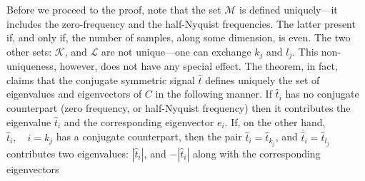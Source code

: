 Before we proceed to the proof, note that the set $\mathcal{M}$ is
defined uniquely---it includes the zero-frequency and the
half-Nyquist
frequencies. The latter present if, and only if, the number
of samples, along some dimension, is even. The two other sets:
$\mathcal{K}$, and $\mathcal{L}$ are not unique---one can exchange
$k_{j}$ and $l_{j}$. This non-uniqueness, however, does not have any
special effect. The theorem, in fact, claims that the conjugate
symmetric signal $\hat{t}$ defines uniquely the set of eigenvalues
and eigenvectors of $C$ in the following manner. If $\hat{t}_{i}$
has no conjugate counterpart (zero frequency, or half-Nyquist
frequency) then it contributes the eigenvalue $\hat{t}_{i}$ and the
corresponding eigenvector $e_{i}$. If, on the other hand,
$\hat{t}_{i}, \quad i = k_{j}$ has a conjugate counterpart, then
the pair  $\hat{t}_{i}=\hat{t}_{k_{j}}$, and $\bar{\hat{t}}_{i} =
\hat{t}_{l_{j}}$ contributes two eigenvalues:
$|\hat{t}_{i}|$, and $-|\hat{t}_{i}|$ along with the corresponding
eigenvectors

